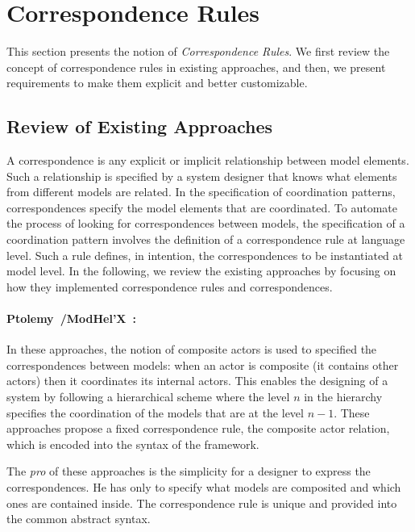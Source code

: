 \section{Correspondence Rules}
This section presents the notion of \emph{Correspondence Rules}. We first review the concept of correspondence rules in existing approaches, and then, we present requirements to make them explicit and better customizable.  

\subsection{Review of Existing Approaches}
A correspondence is any explicit or implicit relationship between model elements. Such a relationship is specified by a system designer that knows what elements from different models are related. In the specification of coordination patterns, correspondences specify the model elements that are coordinated. To automate the process of looking for correspondences between models, the specification of a coordination pattern involves the definition of a correspondence rule at language level. Such a rule defines, in intention, the correspondences to be instantiated at model level. In the following, we review the existing approaches by focusing on how they implemented correspondence rules and correspondences.       

\paragraph{Ptolemy~\cite{ptoleframebib}/ModHel'X~\cite{modhelxbib}:}
In these approaches, the notion of composite actors is used to specified the correspondences between models: when an actor is composite (\ie it contains other actors) then it coordinates its internal actors. This enables the designing of a system by following a hierarchical scheme where the level $n$ in the hierarchy specifies the coordination of the models that are at the level $n-1$. These approaches propose a fixed correspondence rule, \ie the composite actor relation, which is encoded into the syntax of the framework.

The \emph{pro} of these approaches is the simplicity for a designer to express the correspondences. He has only to specify what models are composited and which ones are contained inside. The correspondence rule is unique and provided into the common abstract syntax. 

